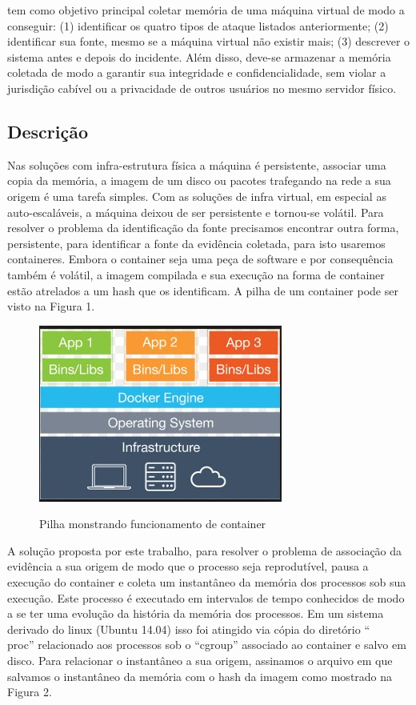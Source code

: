\documentclass[conference]{IEEEtran}
\begin{document}
tem como objetivo principal coletar memória de uma máquina virtual de modo a conseguir: 
(1) identificar os quatro tipos de ataque listados anteriormente; 
(2) identificar sua fonte, mesmo se a máquina virtual não existir mais; 
(3) descrever o sistema antes e depois do incidente.
%
Além disso, deve-se armazenar a memória coletada de modo a garantir sua integridade e confidencialidade, sem violar a jurisdição cabível ou a privacidade de outros usuários no mesmo servidor físico.

\subsection{Descrição}

Nas soluções com infra-estrutura física a máquina é persistente, associar uma copia da memória, a imagem de um disco ou pacotes trafegando na rede a sua origem é uma tarefa simples.
%
Com as soluções de infra virtual, em especial as auto-escaláveis, a máquina deixou de ser persistente e tornou-se volátil. 
%
Para resolver o problema da identificação da fonte precisamos encontrar outra forma, persistente, para identificar a fonte da evidência coletada, para isto usaremos containeres. 
%
Embora o container seja uma peça de software e por consequência também é volátil, a imagem compilada e sua execução na forma de container estão atrelados a um hash que os identificam. 
%
A pilha de um container pode ser visto na Figura 1.\\

\begin{figure}[h]
\caption{Pilha monstrando funcionamento de container}
\includegraphics[scale=0.5]{docker.jpg}
\centering
\label{fig:instantaneo}
\end{figure}

A solução proposta por este trabalho, para resolver o problema de associação da evidência a sua origem de modo que o processo seja reprodutível, pausa a execução do container e coleta um instantâneo da memória dos processos sob sua execução. 
%
Este processo é executado em intervalos de tempo conhecidos de modo a se ter uma evolução da história da memória dos processos. Em um sistema derivado do linux (Ubuntu 14.04) isso foi atingido via cópia do diretório ``\\proc'' relacionado aos processos sob o ``cgroup'' associado ao container e salvo em disco. 
%
Para relacionar o instantâneo a sua origem, assinamos o arquivo em que salvamos o instantâneo da memória com o hash da imagem como mostrado na Figura 2.\\
\end{document}
